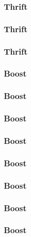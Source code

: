 \documentclass[t]{beamer}
\begin{document}
\begin{frame}
  \frametitle{Thrift}

  
\end{frame}

\begin{frame}
  \frametitle{Thrift}

  
\end{frame}

\begin{frame}
  \frametitle{Thrift}

  
\end{frame}

\begin{frame}
  \frametitle{Boost}

  
\end{frame}

\begin{frame}
  \frametitle{Boost}

  
\end{frame}

\begin{frame}
  \frametitle{Boost}

  
\end{frame}

\begin{frame}
  \frametitle{Boost}

  
\end{frame}

\begin{frame}
  \frametitle{Boost}

  
\end{frame}

\begin{frame}
  \frametitle{Boost}

  
\end{frame}

\begin{frame}
  \frametitle{Boost}

  
\end{frame}

\begin{frame}
  \frametitle{Boost}

  
\end{frame}
\end{document}

